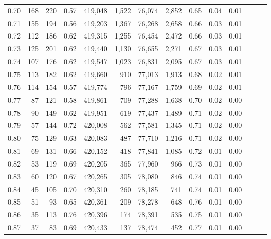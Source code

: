 \begin{tabular}{rrrrrrrrrrrrrr}
0.70 &     168 &    220 &  0.57 &  419,048 &    1,522 &  76,074 &   2,852 &  0.65 &  0.04 &      0.01 \\
0.71 &     155 &    194 &  0.56 &  419,203 &    1,367 &  76,268 &   2,658 &  0.66 &  0.03 &      0.01 \\
0.72 &     112 &    186 &  0.62 &  419,315 &    1,255 &  76,454 &   2,472 &  0.66 &  0.03 &      0.01 \\
0.73 &     125 &    201 &  0.62 &  419,440 &    1,130 &  76,655 &   2,271 &  0.67 &  0.03 &      0.01 \\
0.74 &     107 &    176 &  0.62 &  419,547 &    1,023 &  76,831 &   2,095 &  0.67 &  0.03 &      0.01 \\
0.75 &     113 &    182 &  0.62 &  419,660 &      910 &  77,013 &   1,913 &  0.68 &  0.02 &      0.01 \\
0.76 &     114 &    154 &  0.57 &  419,774 &      796 &  77,167 &   1,759 &  0.69 &  0.02 &      0.01 \\
0.77 &      87 &    121 &  0.58 &  419,861 &      709 &  77,288 &   1,638 &  0.70 &  0.02 &      0.00 \\
0.78 &      90 &    149 &  0.62 &  419,951 &      619 &  77,437 &   1,489 &  0.71 &  0.02 &      0.00 \\
0.79 &      57 &    144 &  0.72 &  420,008 &      562 &  77,581 &   1,345 &  0.71 &  0.02 &      0.00 \\
0.80 &      75 &    129 &  0.63 &  420,083 &      487 &  77,710 &   1,216 &  0.71 &  0.02 &      0.00 \\
0.81 &      69 &    131 &  0.66 &  420,152 &      418 &  77,841 &   1,085 &  0.72 &  0.01 &      0.00 \\
0.82 &      53 &    119 &  0.69 &  420,205 &      365 &  77,960 &     966 &  0.73 &  0.01 &      0.00 \\
0.83 &      60 &    120 &  0.67 &  420,265 &      305 &  78,080 &     846 &  0.74 &  0.01 &      0.00 \\
0.84 &      45 &    105 &  0.70 &  420,310 &      260 &  78,185 &     741 &  0.74 &  0.01 &      0.00 \\
0.85 &      51 &     93 &  0.65 &  420,361 &      209 &  78,278 &     648 &  0.76 &  0.01 &      0.00 \\
0.86 &      35 &    113 &  0.76 &  420,396 &      174 &  78,391 &     535 &  0.75 &  0.01 &      0.00 \\
0.87 &      37 &     83 &  0.69 &  420,433 &      137 &  78,474 &     452 &  0.77 &  0.01 &      0.00 \\

\end{tabular}
